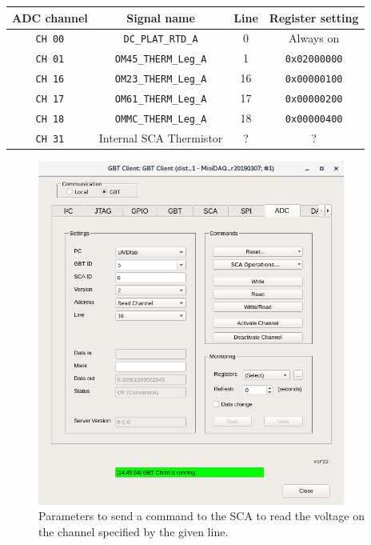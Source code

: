\begin{center}
    \begin{tabular}{cccc}
        \toprule
        ADC channel & Signal name & Line & Register setting \\
        \midrule
        \texttt{CH 00} & \texttt{DC\_PLAT\_RTD\_A}    & 0  & Always on \\
        \texttt{CH 01} & \texttt{OM45\_THERM\_Leg\_A} & 1  & \texttt{0x02000000} \\
        \texttt{CH 16} & \texttt{OM23\_THERM\_Leg\_A} & 16 & \texttt{0x00000100} \\
        \texttt{CH 17} & \texttt{OM61\_THERM\_Leg\_A} & 17 & \texttt{0x00000200} \\
        \texttt{CH 18} & \texttt{OMMC\_THERM\_Leg\_A} & 18 & \texttt{0x00000400} \\
        \texttt{CH 31} & Internal SCA Thermistor      & ?  & ? \\
        \bottomrule
    \end{tabular}
    \label{tab:register-channel-correspondence}
\end{center}

\begin{figure}[ht]
    \centering
    \includegraphics[width=0.9\textwidth]{res/gbt_client_adc_readout_readchannel.png}
    \caption{
        Parameters to send a command to the SCA to read the voltage on the
        channel specified by the given line.
    }
    \label{fig:adc-readout}
\end{figure}


